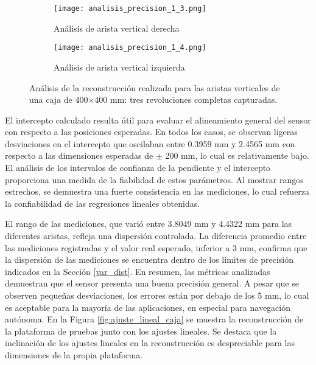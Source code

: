 \begin{figure}[H]
	\centering
	\begin{subfigure}{0.45\textwidth}
		\centering
		\texttt{[image: analisis\_precision\_1\_3.png]}
		\caption{Análisis de arista vertical derecha}
		\label{analisis_precision_1_3}
	\end{subfigure}
	\hspace{1em}
	\begin{subfigure}{0.45\textwidth}
		\centering
		\texttt{[image: analisis\_precision\_1\_4.png]}
		\caption{Análisis de arista vertical izquierda}
		\label{analisis_precision_1_4}
	\end{subfigure}
	\caption{Análisis de la reconstrucción realizada para las aristas verticales de una caja de 400$\times$400 mm: tres revoluciones completas capturadas.}
	\label{fig: reconstruccion_analisis_vertical_1}
\end{figure}

El intercepto calculado resulta útil para evaluar el alineamiento general del sensor con respecto a las posiciones esperadas. En todos los casos, se observan ligeras desviaciones en el intercepto que oscilaban entre 0.3959 mm y 2.4565 mm con respecto a las dimensiones esperadas de $\pm$ 200 mm, lo cual es relativamente bajo. El análisis de los intervalos de confianza de la pendiente y el intercepto proporciona una medida de la fiabilidad de estos parámetros. Al mostrar rangos estrechos, se demuestra una fuerte consistencia en las mediciones, lo cual refuerza la confiabilidad de las regresiones lineales obtenidas. 

El rango de las mediciones, que varió entre 3.8049 mm y 4.4322 mm para las diferentes aristas, refleja una dispersión controlada. La diferencia promedio entre las mediciones registradas y el valor real esperado, inferior a 3 mm, confirma que la dispersión de las mediciones se encuentra dentro de los límites de precisión indicados en la Sección \ref{var_dist}. En resumen, las métricas analizadas demuestran que el sensor presenta una buena precisión general. A pesar que se observen pequeñas desviaciones, los errores están por debajo de los 5 mm, lo cual es aceptable para la mayoría de las aplicaciones, en especial para navegación autónoma. En la Figura \ref{fig:ajuste_lineal_caja} se muestra la reconstrucción de la plataforma de pruebas junto con los ajustes lineales. Se destaca que la inclinación de los ajustes lineales en la reconstrucción es despreciable para las dimensiones de la propia plataforma.

